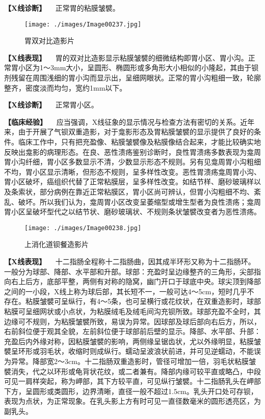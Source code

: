 \textbf{【X线诊断】} 　正常胃的粘膜皱襞。

\begin{figure}[!htbp]
 \centering
 \texttt{[image: ./images/Image00237.jpg]}
 \captionsetup{justification=centering}
 \caption{胃双对比造影片}
 \label{fig5-1-5}
  \end{figure} 

\textbf{【X线表现】}
　胃的双对比造影显示粘膜皱襞的细微结构即胃小区、胃小沟。正常胃小区为1～3mm大小，呈圆形、椭圆形或多角形大小相似的小隆起，其由于钡剂残留在周围浅细的胃小沟而显示出，呈细网眼状。正常的胃小沟粗细一致，轮廓整齐，密度淡而均匀，宽约1mm以下。

\textbf{【X线诊断】} 　正常胃小区。

\textbf{【临床经验】}
　应当强调，X线征象的显示情况与检查方法有密切的关系。近年来，由于开展了气钡双重造影，对于龛影形态及胃粘膜皱襞的显示提供了良好的条件。临床工作中，只有把充盈像、粘膜皱襞像及粘膜像结合起来，才能比较确实地反映出龛影的病理形态。在良、恶性溃疡鉴别诊断时，良性胃溃疡多数表现为龛周胃小沟纤细，胃小区多数显示不清，少数显示形态不规则。另有见龛周胃小沟粗细不均，胃小区显示清晰，但形态不规则，呈多样性改变。恶性胃溃疡龛周胃小沟、胃小区破坏，癌组织代替了正常粘膜层，呈多样性改变。如结节样、磨砂玻璃样以及条索状，部分病例在靠近正常粘膜区，胃小区尚可辨认，但胃小沟粗细不均、紊乱、破坏。所以我们认为，龛周胃小区改变呈萎缩型或增生型者为良性溃疡；龛周胃小区呈破坏型代之以结节状、磨砂玻璃状、不规则条状皱襞改变者为恶性溃疡。

\begin{figure}[!htbp]
 \centering
 \texttt{[image: ./images/Image00238.jpg]}
 \captionsetup{justification=centering}
 \caption{上消化道钡餐造影片}
 \label{fig5-1-6}
  \end{figure} 

\textbf{【X线表现】}
　十二指肠全程称十二指肠曲，因其成半环形又称为十二指肠环。一般分为球部、降部、水平部和升部。球部：充盈时呈边缘整齐的三角形，尖部指向右上后方，底部平整，两侧有对称的隐窝，幽门开口于球底中央。球尖顶到降部之间的一小段，X线上称为球后部，其长短不一，一般可达4～5cm，短时几乎不存在。粘膜皱襞可呈纵行，有4～5条，也可呈横行或花纹状，在双重造影时，球部粘膜可呈细网状或小点状，为粘膜绒毛及绒毛间沟充钡所致。球部充盈不全时，其边缘可不规则，为粘膜皱襞所致，易误为异常。因球部及球后部向右后方，所以，右前斜位便于观其全貌，左前斜位便于球部前后壁的显示。降部、水平部、升部：充盈后内外缘对称，因粘膜皱襞的影响，两侧缘呈锯齿状，尤以外缘明显，粘膜皱襞呈环形或羽毛状，收缩时则成纵行。蠕动呈波浪状前进，并可见逆蠕动，不能误为异常。降部宽2～3cm。十二指肠双重造影时，管径可增加一倍，羽毛状粘膜皱襞消失，代之以环形或龟背状花纹，或二者兼有。降部内缘可较平直或略凸，中段可见一肩样突起，称为岬部，其下方较平直，可见纵行皱襞。十二指肠乳头在岬部下方，呈圆形或类圆形，边界清晰，直径一般不超过1.5cm。乳头开口处可存钡，表现为点状，为正常现象。在乳头影上方有时可见一直径数毫米的圆形透亮区，为副乳头。

